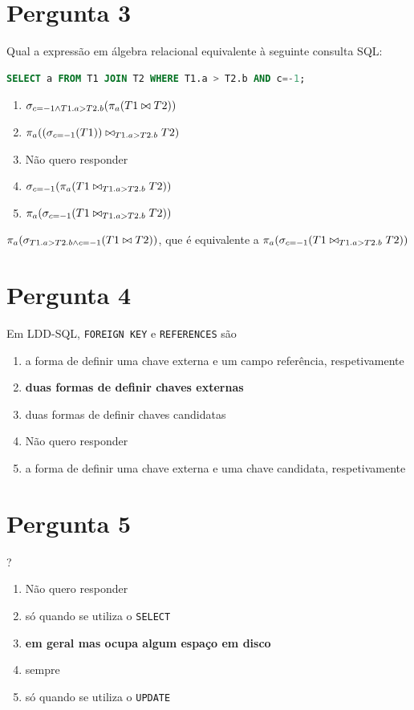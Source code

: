 \documentclass[type=recurso, year=2015/16]{bdad_exam}
\begin{document}
{\section{Pergunta 3}
Qual a expressão em álgebra relacional equivalente à seguinte consulta SQL:
\begin{lstlisting}[language=SQL]
SELECT a FROM T1 JOIN T2 WHERE T1.a > T2.b AND c=-1;
\end{lstlisting}
\begin{enumerate}[label=\alph*.]\itemsep0em
    \item $\sigma_{c=-1 \wedge T1.a > T2.b}(\pi_{a}(T1 \bowtie T2))$
    \item $\pi_{a}((\sigma_{c=-1}(T1)) \bowtie_{T1.a > T2.b} T2)$
    \item Não quero responder
    \item $\sigma_{c=-1}(\pi_{a}(T1 \bowtie_{T1.a > T2.b} T2))$
    \item \textbf{$\pi_{a}(\sigma_{c=-1}(T1 \bowtie_{T1.a > T2.b} T2))$ \greencheckmark}
\end{enumerate}
$\pi_{a}(\sigma_{T1.a > T2.b \wedge c=-1}(T1 \bowtie T2))$, que é equivalente a $\pi_{a}(\sigma_{c=-1}(T1 \bowtie_{T1.a > T2.b} T2))$

\section{Pergunta 4}
Em LDD-SQL, \texttt{FOREIGN KEY} e \texttt{REFERENCES} são
\begin{enumerate}[label=\alph*.]\itemsep0em
    \item a forma de definir uma chave externa e um campo referência, respetivamente
    \item \textbf{duas formas de definir chaves externas \greencheckmark}
    \item duas formas de definir chaves candidatas
    \item Não quero responder
    \item a forma de definir uma chave externa e uma chave candidata, respetivamente
\end{enumerate}

\section{Pergunta 5}
?
\begin{enumerate}[label=\alph*.]\itemsep0em
    \item Não quero responder
    \item só quando se utiliza o \texttt{SELECT}
    \item \textbf{em geral mas ocupa algum espaço em disco \greencheckmark}
    \item sempre
    \item só quando se utiliza o \texttt{UPDATE}
\end{enumerate}

}
\end{document}
